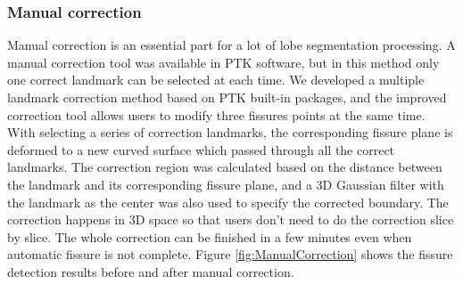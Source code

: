 {\subsubsection{Manual correction}
Manual correction is an essential part for a lot of lobe segmentation processing. A manual correction tool was available in PTK software, but in this method only one correct landmark can be selected at each time. We developed a multiple landmark correction method based on PTK built-in packages, and the improved correction tool allows users to modify three fissures points at the same time. With selecting a series of correction landmarks, the corresponding fissure plane is deformed to a new curved surface which passed through all the correct landmarks. The correction region was calculated based on the distance between the landmark and its corresponding fissure plane, and a 3D Gaussian filter with the landmark as the center was also used to specify the corrected boundary. The correction happens in 3D space so that users don't need to do the correction slice by slice. The whole correction can be finished in a few minutes even when automatic fissure is not complete. Figure \ref{fig:ManualCorrection} shows the fissure detection results before and after manual correction.

}
